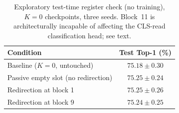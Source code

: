 \begin{table}[h]
\centering
\caption{Exploratory test-time register check (no training), $K=0$
checkpoints, three seeds. Block~11 is architecturally incapable of affecting
the CLS-read classification head; see text.}
\label{tab:test_time_registers}
\begin{tabular}{lc}
\toprule
Condition & Test Top-1 (\%) \\
\midrule
Baseline ($K=0$, untouched)         & $75.18 \pm 0.30$ \\
Passive empty slot (no redirection) & $75.25 \pm 0.24$ \\
Redirection at block 1              & $75.25 \pm 0.26$ \\
Redirection at block 9              & $75.24 \pm 0.25$ \\
\bottomrule
\end{tabular}
\end{table}
